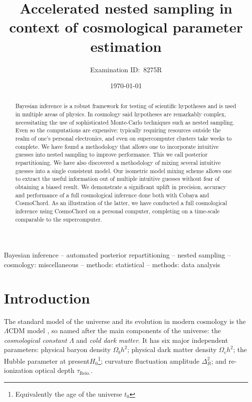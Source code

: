 \documentclass[usenatbib]{mnras}
\author[8275R]{Examination ID:~8275R}
\date{\today}
\title[Accelerated Nested Sampling]{Accelerated nested sampling in context of cosmological parameter estimation}
\begin{document}
\maketitle
\begin{abstract}
  Bayesian inference is a robust framework for testing of scientific
  hypotheses and is used in multiple areas of physics. In cosmology
  said hypotheses are remarkably complex, necessitating the use of
  sophisticated Monte-Carlo techniques such as nested sampling. Even
  so the computations are expensive: typically requiring resources
  outside the realm of one's personal electronics, and even on
  supercomputer clusters take weeks to complete. We have found a
  methodology that allows one to incorporate intuitive guesses into
  nested sampling to improve performance. This we call posterior
  repartitioning. We have also discovered a methodology of mixing
  several intuitive guesses into a single consistent model. Our
  isometric model mixing scheme allows one to extract the useful
  information out of multiple intuitive guesses without fear of
  obtaining a biased result. We demonstrate a significant uplift in
  precision, accuracy and performance of a full cosmological inference
  done both with Cobaya and CosmoChord. As an illustration of the
  latter, we have conducted a full cosmological inference using
  CosmoChord on a personal computer, completing on a time-scale
  comparable to the supercomputer.
\end{abstract}

\begin{keywords}
Bayesian inference -- automated posterior repartitioning -- nested sampling -- cosmology: miscellaneous -- methods: statistical -- methods: data analysis
\end{keywords}

\section{Introduction}\label{sec:org14413d7}

The standard model of the universe and its evolution in modern
cosmology is the \(\Lambda\)CDM model \citep{Condon2018}, so named
after the main components of the universe: the \emph{cosmological
  constant} \(\Lambda\) and \emph{cold dark matter}. It has six major
independent parameters: physical baryon density \(\Omega_{b}h^{2}\);
physical dark matter density \(\Omega_{c}h^{2}\); the Hubble parameter
at present\(H_{0}\)\footnote{Equivalently the age of the universe
  \(t_0\)}; curvature fluctuation amplitude \(\Delta_{R}^{2}\); and
re-ionization optical depth \(\tau_\text{Reio.}\).
\end{document}

